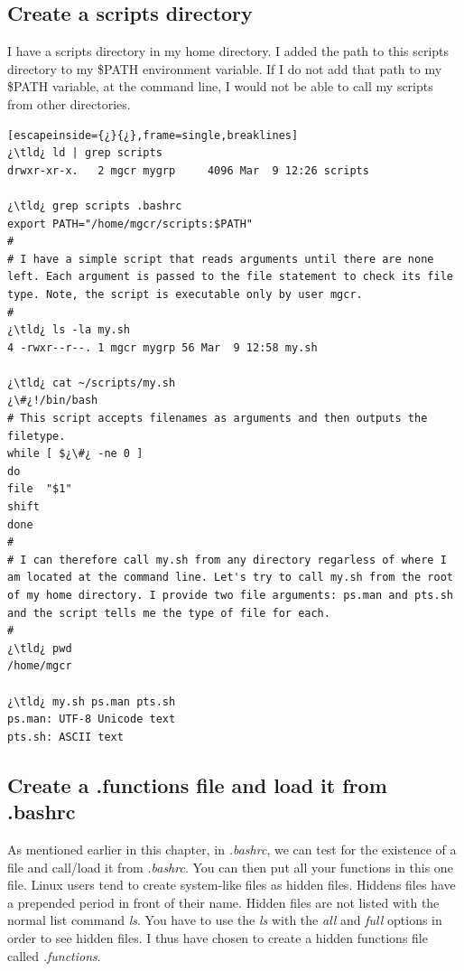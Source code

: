 \subsection{Create a scripts directory}

I have a scripts directory in my home directory. I added the path to this scripts directory to my \$PATH environment variable. If I do not add that path to my \$PATH variable, at the command line, I would not be able to call my scripts from other directories.

\begin{lstlisting}[escapeinside={¿}{¿},frame=single,breaklines]
¿\tld¿ ld | grep scripts
drwxr-xr-x.   2 mgcr mygrp     4096 Mar  9 12:26 scripts

¿\tld¿ grep scripts .bashrc
export PATH="/home/mgcr/scripts:$PATH"
#
# I have a simple script that reads arguments until there are none left. Each argument is passed to the file statement to check its file type. Note, the script is executable only by user mgcr.
#
¿\tld¿ ls -la my.sh
4 -rwxr--r--. 1 mgcr mygrp 56 Mar  9 12:58 my.sh

¿\tld¿ cat ~/scripts/my.sh
¿\#¿!/bin/bash
# This script accepts filenames as arguments and then outputs the filetype.
while [ $¿\#¿ -ne 0 ]
do
file  "$1"
shift
done
#
# I can therefore call my.sh from any directory regarless of where I am located at the command line. Let's try to call my.sh from the root of my home directory. I provide two file arguments: ps.man and pts.sh and the script tells me the type of file for each.
#
¿\tld¿ pwd
/home/mgcr

¿\tld¿ my.sh ps.man pts.sh
ps.man: UTF-8 Unicode text
pts.sh: ASCII text
\end{lstlisting}

\subsection{Create a .functions file and load it from .bashrc}

As mentioned earlier in this chapter, in \textsl{.bashrc}, we can test for the existence of a file and call/load it from \textsl{.bashrc}. You can then put all your functions in this one file. Linux users tend to create system-like files as hidden files. Hiddens files have a prepended period in front of their name. Hidden files are not listed with the normal list command \emph{ls}. You have to use the \emph{ls} with the \emph{all} and \emph{full} options in order to see hidden files. I thus have chosen to create a hidden functions file called \textsl{.functions}.

